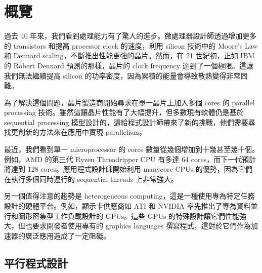 \chapter{概覽}

過去 40 年來，我們看到處理能力有了驚人的進步。微處理器設計師透過增加更多的 transistors 和提高 processor clock 的速度，利用 silicon 技術中的 Moore's Law 和 Dennard scaling，不斷推出性能更強的晶片。然而，在 21 世紀初，正如 IBM 的 Robert Dennard 預測的那樣，晶片的 clock frequency 達到了一個極限。這讓我們無法繼續提高 silicon 的功率密度，因為累積的能量會導致散熱變得非常困難。

為了解決這個問題，晶片製造商開始尋求在單一晶片上加入多個 cores 的 parallel processing 技術。雖然這讓晶片性能有了大幅提升，但多數現有軟體仍是基於 sequential processing 模型設計的，這給程式設計師帶來了新的挑戰，他們需要尋找更創新的方法來在應用中實現 parallelism。

最近，我們看到單一 microprocessor 的 cores 數量從幾個增加到十幾甚至幾十個。例如，AMD 的第三代 Ryzen Threadripper CPU 有多達 64 cores，而下一代預計將達到 128 cores。應用程式設計師開始利用 manycore CPUs 的優勢，因為它們在執行多個同時運行的 sequential threads 上非常強大。

另一個值得注意的趨勢是 heterogeneous computing，這是一種使用專為特定任務設計的硬體平台。例如，顯示卡供應商如 ATI 和 NVIDIA 率先推出了專為資料並行和圖形密集型工作負載設計的 GPUs。這些 GPUs 的特殊設計讓它們性能強大，但也要求開發者使用專有的 graphics languages 撰寫程式，這對於它們作為加速器的廣泛應用造成了一定阻礙。

\section{平行程式設計}